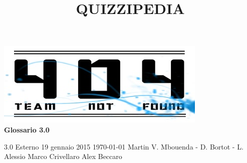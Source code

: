 \documentclass[a4paper,11pt]{article}
\title{\textbf{{\fontsize{8mm}{5mm}\selectfont QUIZZIPEDIA}}}
\begin{document}
	\maketitle
	\thispagestyle{empty}

	\begin{center}
		\includegraphics{../../team_not_found.jpg}\\
		\vspace{20mm}
		\textbf{{\Large Glossario 3.0}}	
	\end{center}

	\thispagestyle{empty}	%
			{3.0} 							%
			{Esterno} 						%
			{19 gennaio 2015} 				%
			{\today} 						%
			{Martin V. Mbouenda - D. Bortot - L. Alessio}		%
			{Marco Crivellaro} 			%
			{Alex Beccaro}					%
			
	\newpage
	\fancyfoot[R]{\thepage}
\end{document}
